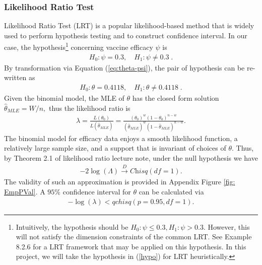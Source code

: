 \documentclass[12pt]{amsart}
\begin{document}
\subsubsection{Likelihood Ratio Test} 

Likelihood Ratio Test (LRT) is a popular likelihood-based method that is widely used to perform hypothesis testing and to construct confidence interval. In our case, the hypothesis\footnote{Intuitively, the hypothesis should be $H_0: \psi \leq 0.3, H_1: \psi > 0.3$. However, this will not satisfy the dimension constraints of the common LRT. See \cite{CB} Example 8.2.6 for a LRT framework that may be applied on this hypothesis. In this project, we will take the hypothesis in (\ref{hypo}) for LRT heuristically.} concerning vaccine efficacy $\psi$ is
\begin{align}
    H_0: \psi = 0.3, \quad H_1: \psi \neq 0.3 \;. 
    \label{hypo}
\end{align}
By transformation via Equation (\ref{eq:theta-psi}), the pair of hypothesis can be re-written as
\begin{align}
    H_0: \theta = 0.4118, \quad H_1:  \theta \neq 0.4118 \;.
\end{align}
Given the binomial model, the MLE of $\theta$ has the closed form solution
    $\widehat{\theta}_{MLE} = W / n,$
thus the likelihood ratio is 
\begin{align}
    \lambda = \frac{L(\theta_0)}{L(\widehat{\theta}_{MLE})} = \frac{(\theta_0)^w(1-\theta_0)^{n-w}}{(\widehat{\theta}_{MLE})^w(1-\widehat{\theta}_{MLE})^{n-w}}.
\end{align}
The binomial model for efficacy data enjoys a smooth likelihood function, a relatively large sample size, and a support that is invariant of choices of $\theta$. Thus, by Theorem 2.1 of likelihood ratio lecture note, under the null hypothesis we have 
\begin{align}
    -2 \log (\Lambda)\stackrel{D}{\rightarrow} \textit{Chisq}(df=1).
\end{align}
The validity of such an approximation is provided in Appendix Figure \ref{fig: EmpPVal}. A $95\%$ confidence interval for $\theta$ can be calculated via 
\begin{align}
    - \log(\lambda) < qchisq(p = 0.95, df = 1).
\end{align}
\end{document}
